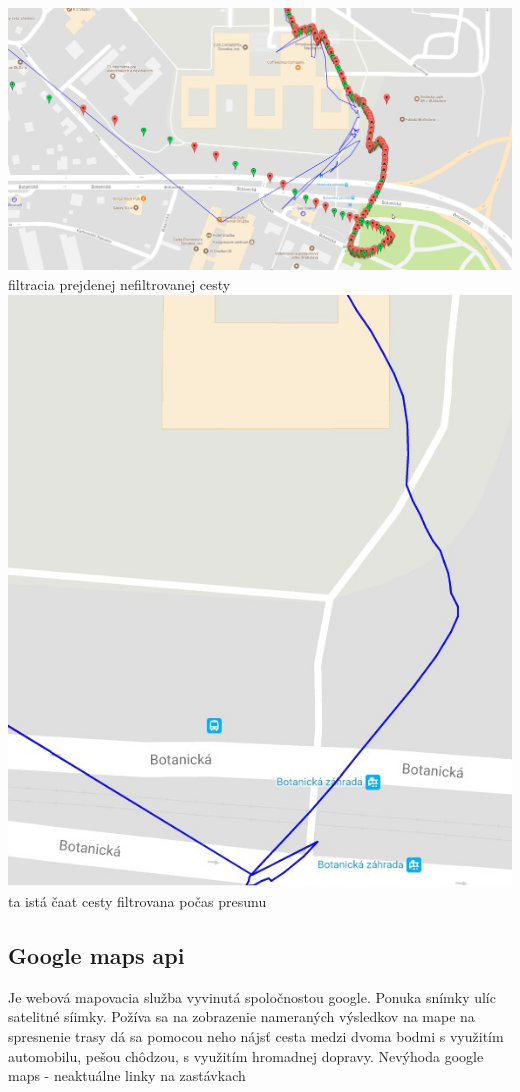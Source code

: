 \includegraphics[width=\textwidth]{images/diplomka}
filtracia prejdenej nefiltrovanej cesty\\
\includegraphics[width=\textwidth]{images/filtrovanie}
ta istá čaat cesty filtrovana počas presunu
\subsection{Google maps api }

Je webová mapovacia služba vyvinutá spoločnostou google. Ponuka snímky ulíc satelitné
síimky. Požíva sa na zobrazenie nameraných výsledkov na mape na spresnenie trasy dá sa
pomocou neho nájsť cesta medzi dvoma bodmi s využitím automobilu, pešou chôdzou,
s využitím hromadnej dopravy. Nevýhoda google maps - neaktuálne linky na zastávkach

